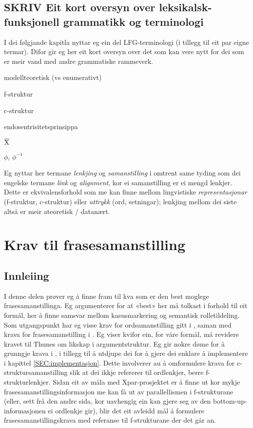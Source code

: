 \documentclass[11pt,a4paper,oneside,draft]{book}
\newcommand{\xbar}{$\rm\overline{X}$}
\begin{document}
\section{\textbf{SKRIV} Eit kort oversyn over leksikalsk-funksjonell grammatikk og terminologi}
\label{sec-2.2}

I dei følgjande kapitla nyttar eg ein del LFG-terminologi (i tillegg
til eit par eigne termar). Difor gir eg her eit kort oversyn over det
som kan vere nytt for dei som er meir vand med andre grammatiske
rammeverk.

\begin{description}
\item modellteoretisk (vs enumerativt) 
\item f-struktur
\item c-struktur
\item endosentrisitetsprinsippa
\item \xbar
\item $\phi$, $\phi^{-1}$
\item [fraselenkjer vs frasesamanstilling] Eg nyttar her termane
  \emph{lenkjing} og \emph{samanstilling} i omtrent same tyding som dei engelske
  termane \emph{link} og \emph{alignment}, kor ei samanstilling er ei mengd
  lenkjer. Dette er ekvivalensforhold som me kan finne mellom
  lingvistiske \emph{representasjonar} (f-struktur, c-struktur) eller
  \emph{uttrykk} (ord, setningar); lenkjing mellom dei siste altså er meir
  ateoretisk / datanært.
\end{description}
\chapter{Krav til frasesamanstilling}
\label{sec-3}

\label{SEC:ideell}

\section{Innleiing}
\label{sec-3.1}

I denne delen prøver eg å finne fram til kva som er den best moglege
frasesamanstillinga. Eg argumenterer for at «best» her må tolkast i
forhold til eit formål, her å finne samsvar mellom kasusmarkering og
semantisk rolletildeling. Som utgangspunkt har eg visse krav for
ordsamanstilling gitt i \citet{thunes2003eal}, saman med krava for
frasesamanstilling i \citet{dyvik2009lmp}. Eg viser kvifor ein, for
våre formål, må revidere kravet til Thunes om likskap i
argumentstruktur. Eg gir nokre døme for å grunngje krava i
\citet{dyvik2009lmp}, i tillegg til å utdjupe dei for å gjere dei
enklare å implementere i kapittel \ref{SEC:implementasjon}. Dette
involverer au å omformulere krava for c-struktursamanstilling slik at
dei ikkje refererer til ordlenkjer, berre f-strukturlenkjer. Sidan eit
av måla med Xpar-prosjektet er å finne ut kor mykje
frasesamanstillingsinformasjon me kan få ut av parallellismen i
f-strukturane (eller, sett frå den andre sida, kor uavhengig ein kan
gjere seg av den bottom-up-informasjonen ei ordlenkje gir), blir det
eit avleidd mål å formulere frasesamanstillingskrava med referanse til
f-strukturane der det går an.
\end{document}
